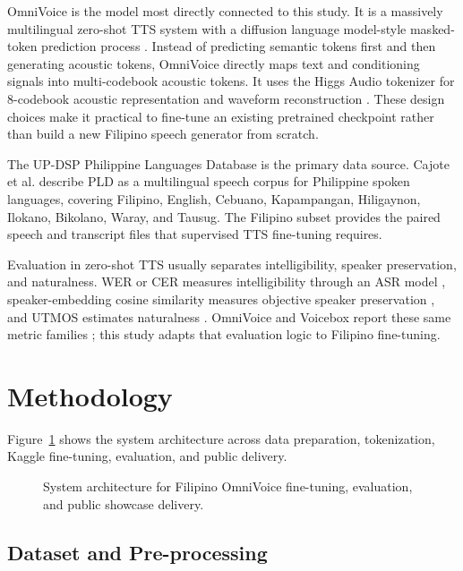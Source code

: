 \documentclass[sigconf,nonacm]{acmart}
\begin{document}
OmniVoice is the model most directly connected to this study. It is a massively multilingual zero-shot TTS system with a diffusion language model-style masked-token prediction process \cite{omnivoice}. Instead of predicting semantic tokens first and then generating acoustic tokens, OmniVoice directly maps text and conditioning signals into multi-codebook acoustic tokens. It uses the Higgs Audio tokenizer for 8-codebook acoustic representation and waveform reconstruction \cite{higgsaudio}. These design choices make it practical to fine-tune an existing pretrained checkpoint rather than build a new Filipino speech generator from scratch.

The UP-DSP Philippine Languages Database is the primary data source. Cajote et al. \cite{pld} describe PLD as a multilingual speech corpus for Philippine spoken languages, covering Filipino, English, Cebuano, Kapampangan, Hiligaynon, Ilokano, Bikolano, Waray, and Tausug. The Filipino subset provides the paired speech and transcript files that supervised TTS fine-tuning requires.

Evaluation in zero-shot TTS usually separates intelligibility, speaker preservation, and naturalness. WER or CER measures intelligibility through an ASR model \cite{whisper,levenshtein}, speaker-embedding cosine similarity measures objective speaker preservation \cite{ecapatdnn,wavlm}, and UTMOS estimates naturalness \cite{utmos}. OmniVoice and Voicebox report these same metric families \cite{omnivoice,voicebox}; this study adapts that evaluation logic to Filipino fine-tuning.

\section{Methodology}

Figure~\ref{fig:pipeline} shows the system architecture across data preparation, tokenization, Kaggle fine-tuning, evaluation, and public delivery.

\begin{figure}[t]
  \centering
  \small
  \resizebox{0.98\textwidth}{!}{}
  \caption{System architecture for Filipino OmniVoice fine-tuning, evaluation, and public showcase delivery.}
  \label{fig:pipeline}
\end{figure}

\subsection{Dataset and Pre-processing}
\end{document}
